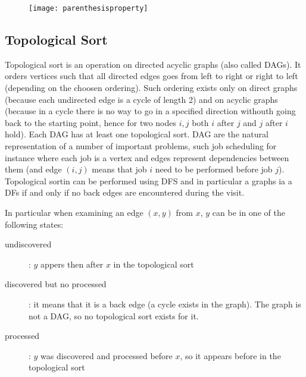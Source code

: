 	\begin{figure}[h]
	\centering
	\label{fig:parenthesisproperty}
		\texttt{[image: parenthesisproperty]}
	\end{figure}



\subsection{Topological Sort}
Topological sort is an operation on directed acyclic graphs (also called DAGs). It orders vertices such that all directed edges goes from left to right or right to left (depending on the choosen ordering). Such ordering exists only on direct graphs (because each undirected edge is a cycle of length 2) and on acyclic graphs (because in a cycle there is no way to go in a specified direction withouth going back to the starting point, hence for two nodes $i,j$ both $i$ after $j$ and $ j$ after $i$ hold). 
Each DAG has at least one topological sort. DAG are the natural representation of a number of important problems, such job scheduling for instance where each job is a vertex and edges represent dependencies between them (and edge $(i,j)$ means that job $i$  need to be performed before job $j$).
Topological sortin can be performed using DFS and in particular a graphs ia a DFs if and only if no back edges are encountered during the visit.

In particular when examining an edge $(x,y)$ from $x$, $y$ can be in one of the following states:
\begin{description}
\item [undiscovered]: $y$ appers then after $x$ in the topological sort
\item [discovered but no processed]: it means that it is a back edge (a cycle exists in the graph). The graph is not a DAG, so no topological sort exists for it.
\item [processed]: $y$ was discovered and processed before $x$, so it appears before in the topological sort
\end{description}



